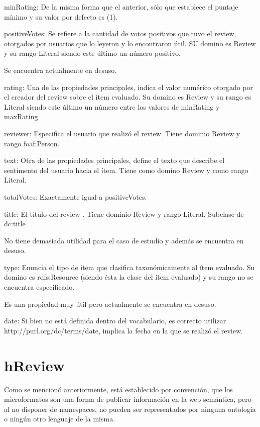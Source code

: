 minRating: De la misma forma que el anterior, sólo que establece el puntaje mínimo y su valor por defecto es (1).


positiveVotes: Se refiere a la cantidad de votos positivos que tuvo el review, otorgados por usuarios que lo leyeron y lo encontraron 
útil. SU domino es Review y su rango Literal siendo este último un número positivo.


Se encuentra actualmente en desuso.


rating: Una de las propiedades principales, indica el valor numérico otorgado por el creador del review sobre el ítem evaluado. 
Su domino es Review y su rango es Literal siendo este último un número entre los valores de minRating y maxRating.


reviewer: Especifica el usuario que realizó el review. Tiene dominio Review y rango foaf:Person. 



text: Otra de las propiedades principales, define el texto que describe el sentimento del usuario hacia el ítem. Tiene como 
domino Review y como rango Literal.


totalVotes: Exactamente igual a positiveVotes.


title: El título del review . Tiene dominio Review y rango Literal. Subclase de dc:title


No tiene demasiada utilidad para el caso de estudio y además se encuentra en desuso.


type: Enuncia el tipo de ítem que clasifica taxonómicamente al ítem evaluado. Su domino es rdfs:Resource (siendo ésta la clase del ítem evaluado)  
y su rango no se encuentra especificado. 


Es una propiedad muy útil pero actualmente se encuentra en desuso.


date: Si bien no está definida dentro del vocabulario, es correcto utilizar http://purl.org/dc/terms/date, implica la fecha en la 
que se realizó el review.


\section{hReview}
\label{section:hreview}

Como se mencionó anteriormente, está establecido por convención, que los microformatos son una forma de publicar información en la 
web semántica, pero al no disponer de namespaces, no pueden ser representados por ninguna ontología o ningún otro lenguaje de la misma. 


